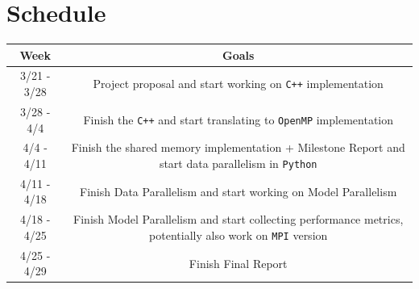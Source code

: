 \documentclass{article}
\begin{document}
\section*{Schedule}

\begin{center}
	\begin{tabular}{ |c|c| }
		\hline
		Week & Goals \\
		\hline
		3/21 - 3/28 & Project proposal and start working on \texttt{C++} implementation \\
		\hline
		3/28 - 4/4 & Finish the \texttt{C++} and start translating to \texttt{OpenMP} implementation\\
		\hline
		4/4 - 4/11 & Finish the shared memory implementation + Milestone Report and start data parallelism in \texttt{Python} \\
		\hline
		4/11 - 4/18 & Finish Data Parallelism and start working on Model Parallelism\\
		\hline
		4/18 - 4/25 & Finish Model Parallelism and start collecting performance metrics, potentially also work on \texttt{MPI} version\\
		\hline
		4/25 - 4/29 & Finish Final Report\\
		\hline
	\end{tabular}\\
\end{center}
\end{document}
